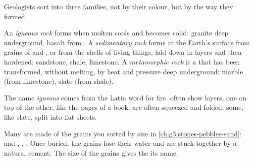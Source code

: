 Geologists sort  into three families, not by their colour, but by the
way they formed.

\begin{definition}\label{def:g6:rocks-and-minerals:rock-families}
An \emph{igneous rock} forms when molten  cools and
becomes solid: granite deep underground, basalt from .
A \emph{sedimentary rock} forms at the Earth's
surface from grains of  and , or from the shells of living things,
laid down in layers and then hardened: sandstone, shale, limestone.
A \emph{metamorphic rock} is a  that has been
transformed, without melting, by heat and pressure deep underground: marble
(from limestone), slate (from shale).
\end{definition}

The name \emph{igneous} comes from the Latin word for fire.  often show layers, one on top of the other, like the pages of a
book.  are often squeezed and folded; some, like slate,
split into flat sheets.

Many  are made of the grains you sorted by size in
\cref{ch:g3:stones-pebbles-sand}:  and , , . Once
buried, the grains lose their water and are stuck together by a natural
cement. The size of the grains gives the  its name.

